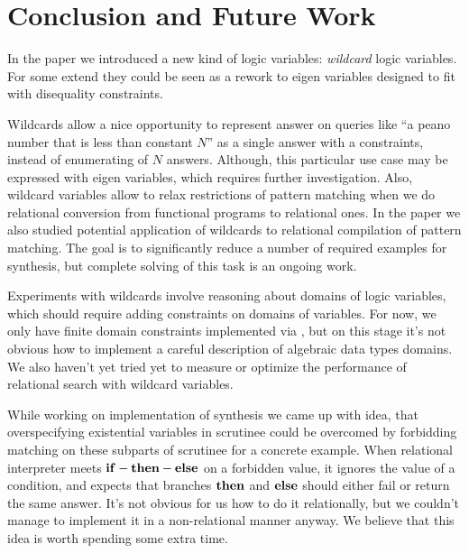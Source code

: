 
\section{Conclusion and Future Work}

In  the paper we introduced a new kind of logic variables: \emph{wildcard} logic variables.
For some extend they could be seen as a rework to eigen variables designed to fit with disequality constraints.

Wildcards allow a nice opportunity to represent answer on queries like ``a peano number that is less than constant $N$'' as a single answer with a constraints, instead of enumerating of $N$ answers. Although, this particular use case may be expressed with eigen variables, which requires further investigation. Also, wildcard variables allow to relax restrictions of pattern matching when we do relational conversion from functional programs to relational ones.
In the paper we also studied potential application of wildcards to relational compilation of pattern matching. The goal is to significantly reduce a number of required examples for synthesis, but complete solving of this task is an ongoing work.

Experiments with wildcards involve reasoning about domains of logic variables, which should require adding constraints on  domains of variables. For now, we only have finite domain constraints implemented via \Zthree{}, but on this stage it's not obvious how to implement a  careful description of algebraic data types domains. We also haven't yet tried yet to measure or optimize the performance of relational search with wildcard variables.

While working on implementation of synthesis we came up with idea, that overspecifying existential variables in scrutinee could be overcomed by forbidding matching on these subparts of scrutinee for a concrete example.
When relational interpreter meets $\mathbf{if-then-else}$ on a forbidden value, it ignores the value of a condition, and expects that  branches $\mathbf{then}$ and $\mathbf{else}$ should either fail or return the same answer.
It's not obvious for us how to do it relationally, but we couldn't manage to implement it in a non-relational manner anyway. We believe that this idea is worth spending some extra time.









